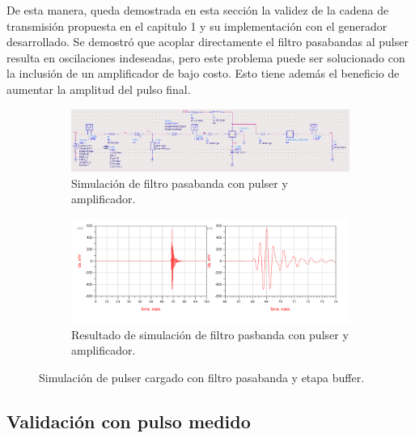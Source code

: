 De esta manera, queda demostrada en esta sección la validez de la cadena de transmisión
propuesta en el capitulo 1 y su implementación con el generador desarrollado. Se
demostró que acoplar directamente el filtro pasabandas al pulser resulta en
oscilaciones indeseadas, pero este problema puede ser solucionado con la
inclusión de un amplificador de bajo costo. Esto tiene además el beneficio de
aumentar la amplitud del pulso final.

\begin{figure}[t]
    \centering
    \begin{subfigure}[b]{0.45\textwidth}
        \centering
        \includegraphics[width=\linewidth]{images/passband_pulser_sim_with_amp.png}
        \caption{Simulación de filtro pasabanda con pulser y amplificador.}
        \label{fig:passband_pulser_sim_with_amp}
    \end{subfigure}
    \hfill
    \begin{subfigure}[b]{0.45\textwidth}
        \centering
        \includegraphics[width=\linewidth]{images/passband_pulser_sim_with_amp_result.png}
        \caption{Resultado de simulación de filtro pasbanda con pulser y
        amplificador.}
        \label{fig:passband_pulser_sim_with_amp_result}
    \end{subfigure}
    \caption{Simulación de pulser cargado con filtro pasabanda y etapa buffer.}
    \label{fig:passband_pulser_with_amp}
\end{figure}

\subsection{Validación con pulso medido}

